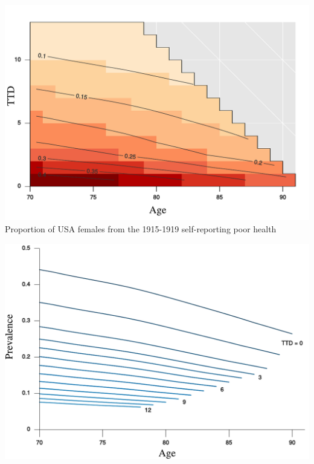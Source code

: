 \documentclass[20pt]{beamer}
\begin{document}
\begin{frame}[plain]
\begin{center}
\includegraphics[scale=1.2]{Figures/srhpoor_f_Surf_a.pdf}
\\
\small Proportion of USA
females from the 1915-1919 self-reporting poor health
\end{center}
\end{frame}

\begin{frame}[plain]
\begin{center}
\includegraphics[scale=1.2]{Figures/srhpoor_f_Age_c.pdf}
\end{center}
\end{frame}
\end{document}
